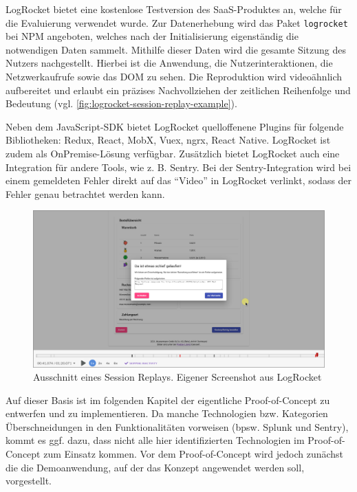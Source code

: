 LogRocket bietet eine kostenlose Testversion des SaaS-Produktes an, welche für die Evaluierung verwendet wurde. Zur Datenerhebung wird das Paket \texttt{logrocket} bei NPM angeboten, welches nach der Initialisierung eigenständig die notwendigen Daten sammelt. Mithilfe dieser Daten wird die gesamte Sitzung des Nutzers nachgestellt. Hierbei ist die Anwendung, die Nutzerinteraktionen, die Netzwerkaufrufe sowie das DOM zu sehen. Die Reproduktion wird videoähnlich aufbereitet und erlaubt ein präzises Nachvollziehen der zeitlichen Reihenfolge und Bedeutung (vgl. \autoref{fig:logrocket-session-replay-example}).

Neben dem JavaScript-SDK bietet LogRocket quelloffenene Plugins für folgende Bibliotheken: Redux, React, MobX, Vuex, ngrx, React Native. LogRocket ist zudem als OnPremise-Lösung verfügbar. Zusätzlich bietet LogRocket auch eine Integration für andere Tools, wie z. B. Sentry. Bei der Sentry-Integration wird bei einem gemeldeten Fehler direkt auf das \enquote{Video} in LogRocket verlinkt, sodass der Fehler genau betrachtet werden kann.

\begin{figure}[H]
	\centering
	\includegraphics[width=\linewidth]{img/03_methoden/logrocket_session-replay-example-cropped.png}
	\caption{Ausschnitt eines Session Replays. Eigener Screenshot aus LogRocket}
	\label{fig:logrocket-session-replay-example}
\end{figure}

\vspace{\baselineskip}

Auf dieser Basis ist im folgenden Kapitel der eigentliche Proof-of-Concept zu entwerfen und zu implementieren. Da manche Technologien bzw. Kategorien Überschneidungen in den Funktionalitäten vorweisen (bpsw. Splunk und Sentry), kommt es ggf. dazu, dass nicht alle hier identifizierten Technologien im Proof-of-Concept zum Einsatz kommen. Vor dem Proof-of-Concept wird jedoch zunächst die die Demoanwendung, auf der das Konzept angewendet werden soll, vorgestellt.